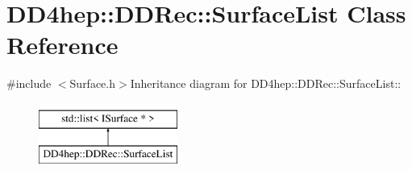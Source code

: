 \hypertarget{class_d_d4hep_1_1_d_d_rec_1_1_surface_list}{
\section{DD4hep::DDRec::SurfaceList Class Reference}
\label{class_d_d4hep_1_1_d_d_rec_1_1_surface_list}
}


{\ttfamily \#include $<$Surface.h$>$}Inheritance diagram for DD4hep::DDRec::SurfaceList::\begin{figure}[H]
\begin{center}
\leavevmode
\includegraphics[height=2cm]{class_d_d4hep_1_1_d_d_rec_1_1_surface_list}
\end{center}
\end{figure}

